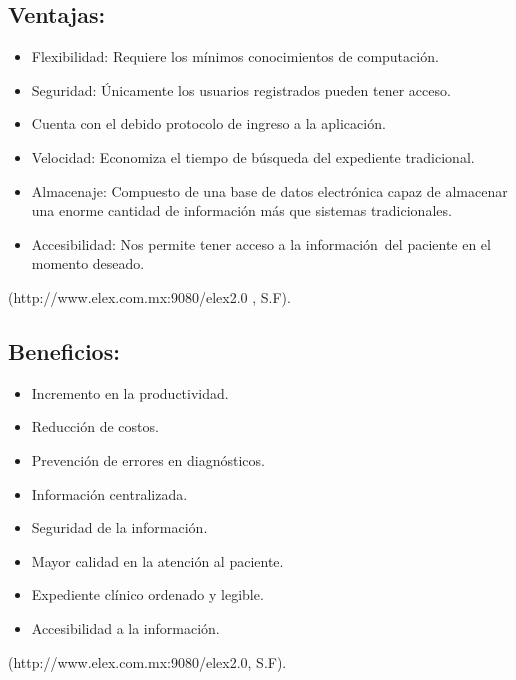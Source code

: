 \subsection{Ventajas:}
\begin{itemize}
  \item Flexibilidad: Requiere los mínimos conocimientos de computación.
  \item Seguridad: Únicamente los usuarios registrados pueden tener acceso. 
  \item Cuenta con el debido protocolo de ingreso a la aplicación.
  \item Velocidad: Economiza el tiempo de búsqueda del expediente tradicional.
  \item Almacenaje: Compuesto de una base de datos electrónica capaz de almacenar una enorme cantidad de información más que sistemas tradicionales.
  \item Accesibilidad: Nos permite tener acceso a la información del paciente en el momento deseado.

\end{itemize}

 (http://www.elex.com.mx:9080/elex2.0 , S.F).

\subsection{Beneficios:}
\begin{itemize}
  \item Incremento en la productividad.
  \item Reducción de costos.
  \item Prevención de errores en diagnósticos.
  \item Información centralizada.
  \item Seguridad de la información.
  \item Mayor calidad en la atención al paciente.
  \item Expediente clínico ordenado y legible.
  \item Accesibilidad a la información.

\end{itemize}

 (http://www.elex.com.mx:9080/elex2.0, S.F).


